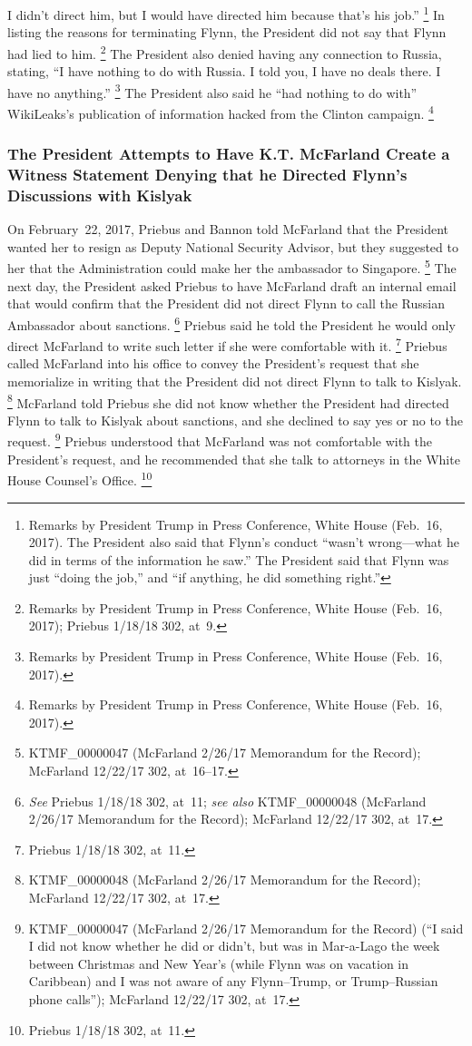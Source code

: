 I didn't direct him, but I would have directed him because that's his job.''%
\footnote{Remarks by President Trump in Press Conference, White House (Feb.~16, 2017).
The President also said that Flynn's conduct ``wasn't wrong---what he did in terms of the information he saw.''
The President said that Flynn was just ``doing the job,'' and ``if anything, he did something right.''}
In listing the reasons for terminating Flynn, the President did not say that Flynn had lied to him.%
\footnote{Remarks by President Trump in Press Conference, White House (Feb.~16, 2017);
Priebus 1/18/18 302, at~9.}
The President also denied having any connection to Russia, stating, ``I have nothing to do with Russia.
I told you, I have no deals there.
I have no anything.''%
\footnote{Remarks by President Trump in Press Conference, White House (Feb.~16, 2017).}
The President also said he ``had nothing to do with'' WikiLeaks's publication of information hacked from the Clinton campaign.%
\footnote{Remarks by President Trump in Press Conference, White House (Feb.~16, 2017).}

\subsubsection{The President Attempts to Have K.T. McFarland Create a Witness Statement Denying that he Directed Flynn's Discussions with Kislyak}

On February~22, 2017, Priebus and Bannon told McFarland that the President wanted her to resign as Deputy National Security Advisor, but they suggested to her that the Administration could make her the ambassador to Singapore.%
\footnote{KTMF\_00000047 (McFarland 2/26/17 Memorandum for the Record);
McFarland 12/22/17 302, at~16--17.}
The next day, the President asked Priebus to have McFarland draft an internal email that would confirm that the President did not direct Flynn to call the Russian Ambassador about sanctions.%
\footnote{\textit{See} Priebus 1/18/18 302, at~11;
\textit{see also} KTMF\_00000048 (McFarland 2/26/17 Memorandum for the Record);
McFarland 12/22/17 302, at~17.}
Priebus said he told the President he would only direct McFarland to write such letter if she were comfortable with it.%
\footnote{Priebus 1/18/18 302, at~11.}
Priebus called McFarland into his office to convey the President's request that she memorialize in writing that the President did not direct Flynn to talk to Kislyak.%
\footnote{KTMF\_00000048 (McFarland 2/26/17 Memorandum for the Record);
McFarland 12/22/17 302, at~17.}
McFarland told Priebus she did not know whether the President had directed Flynn to talk to Kislyak about sanctions, and she declined to say yes or no to the request.%
\footnote{KTMF\_00000047 (McFarland 2/26/17 Memorandum for the Record) (``I said I did not know whether he did or didn't, but was in Mar-a-Lago the week between Christmas and New Year's (while Flynn was on vacation in Caribbean) and I was not aware of any Flynn--Trump, or Trump--Russian phone calls'');
McFarland 12/22/17 302, at~17.}
Priebus understood that McFarland was not comfortable with the President's request, and he recommended that she talk to attorneys in the White House Counsel's Office.%
\footnote{Priebus 1/18/18 302, at~11.}

